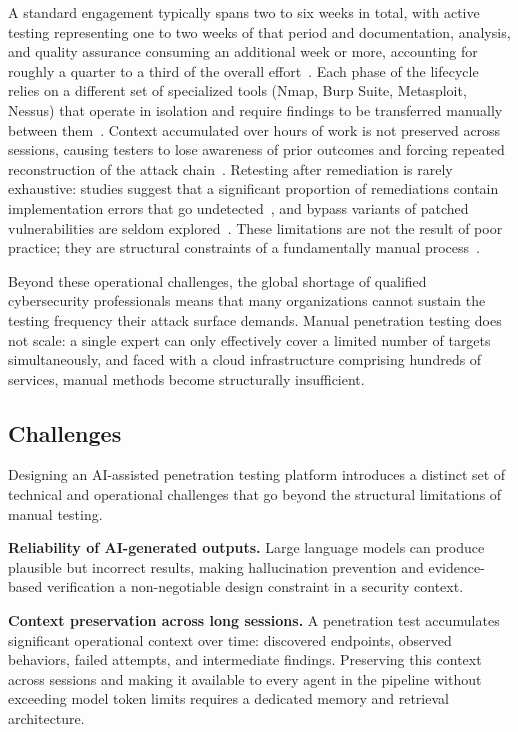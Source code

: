 \documentclass[12pt,a4paper]{report}
\begin{document}
A standard engagement typically spans two to six weeks in total, with active
testing representing one to two weeks of that period and documentation, analysis,
and quality assurance consuming an additional week or more, accounting for roughly
a quarter to a third of the overall effort~\cite{triaxiomTimeline,valuementorLifecycle}.
Each phase of the lifecycle relies on a different set of specialized tools (Nmap,
Burp Suite, Metasploit, Nessus) that operate in isolation and require findings to
be transferred manually between them~\cite{autosecagent2026,emazzantiTools}. Context
accumulated over hours of work is not preserved across sessions, causing testers to
lose awareness of prior outcomes and forcing repeated reconstruction of the attack
chain~\cite{pentestgpt2023}. Retesting after remediation is rarely exhaustive: studies
suggest that a significant proportion of remediations contain implementation errors
that go undetected~\cite{hedgehogRetesting}, and bypass variants of patched
vulnerabilities are seldom explored~\cite{redleggRetesting,halockVerification}. These
limitations are not the result of poor practice; they are structural constraints of
a fundamentally manual process~\cite{autosecagent2026,cycognitoPentest}.

Beyond these operational challenges, the global shortage of qualified cybersecurity
professionals means that many organizations cannot sustain the testing frequency
their attack surface demands. Manual penetration testing does not scale: a single
expert can only effectively cover a limited number of targets simultaneously, and
faced with a cloud infrastructure comprising hundreds of services, manual methods
become structurally insufficient.

\subsection{Challenges}

Designing an AI-assisted penetration testing platform introduces a distinct set of
technical and operational challenges that go beyond the structural limitations of
manual testing.

\textbf{Reliability of AI-generated outputs.} Large language models can produce
plausible but incorrect results, making hallucination prevention and evidence-based
verification a non-negotiable design constraint in a security context.

\textbf{Context preservation across long sessions.} A penetration test accumulates
significant operational context over time: discovered endpoints, observed behaviors,
failed attempts, and intermediate findings. Preserving this context across sessions
and making it available to every agent in the pipeline without exceeding model token
limits requires a dedicated memory and retrieval architecture.
\end{document}
